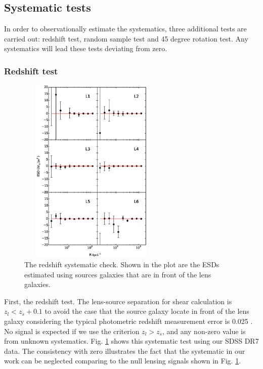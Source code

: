 \documentclass[apj]{emulateapj}
\begin{document}
\subsection{Systematic tests}

In order to observationally estimate the systematics, three additional
tests are carried out: redshift test, random sample test and 45 degree
rotation test. Any systematics will lead these tests deviating from
zero.


\subsubsection{Redshift test}

\begin{figure}
\centering
\includegraphics[width=7cm,height=9cm]{f11.eps}
\caption{The redshift systematic check. Shown in the plot are the ESDs
estimated using sources galaxies that are in front of the lens
galaxies. }
  \label{fig:test1}
\end{figure}



First, the redshift test. The lens-source separation for shear
calculation is $z_l<z_s+0.1$ to avoid the case that the source galaxy
locate in front of the lens galaxy considering the typical photometric
redshift measurement error is 0.025 \citep{Abazajian2009}.  No signal
is expected if we use the criterion $z_l>z_s$, and any non-zero value
is from unknown systematics. Fig. \ref{fig:test1} shows this
systematic test using our SDSS DR7 data. The consistency with zero
illustrates the fact that the systematic in our work can be neglected
comparing to the null lensing signals shown in Fig. \ref{fig:test1}.
\end{document}

